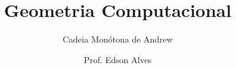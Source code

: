 \title{Geometria Computacional}
\subtitle{Cadeia Monótona de Andrew}
\date{}
\author{Prof. Edson Alves}
